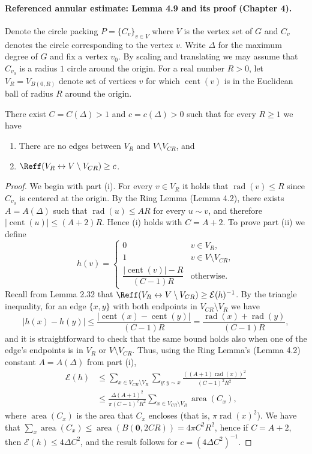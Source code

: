 \paragraph{Referenced annular estimate: Lemma 4.9 and its proof (Chapter 4).}
Denote the circle packing $P=\{C_v\}_{v\in V}$ where $V$ is the vertex set of $G$ and $C_v$ denotes the circle corresponding to the vertex $v$. Write $\Delta$ for the maximum degree of $G$ and fix a vertex $v_0$. By scaling and translating we may assume that $C_{v_0}$ is a radius $1$ circle around the origin. For a real number $R>0$, let $V_R=V_{B(0,R)}$ denote set of vertices $v$ for which $\operatorname{cent}(v)$ is in the Euclidean ball of radius $R$ around the origin.
\begin{lemma}[4.9]
There exist $C=C(\Delta)>1$ and $c=c(\Delta)>0$ such that for every $R\ge1$ we have
\begin{enumerate}[label=(\roman*)]
\item There are no edges between $V_R$ and $V\setminus V_{CR}$, and
\item $\Reff(V_R\leftrightarrow V\setminus V_{CR})\ge c$.
\end{enumerate}
\end{lemma}
\begin{proof}
We begin with part (i). For every $v\in V_R$ it holds that $\operatorname{rad}(v)\le R$ since $C_{v_0}$ is centered at the origin. By the Ring Lemma (Lemma 4.2), there exists $A=A(\Delta)$ such that $\operatorname{rad}(u)\le AR$ for every $u\sim v$, and therefore $|\operatorname{cent}(u)|\le(A+2)R$. Hence (i) holds with $C=A+2$.
To prove part (ii) we define
\[
h(v)=\begin{cases}
0&v\in V_R,\\1&v\in V\setminus V_{CR},\\
\dfrac{|\operatorname{cent}(v)|-R}{(C-1)R}&\text{otherwise}.
\end{cases}
\]
Recall from Lemma 2.32 that $\Reff(V_R\leftrightarrow V\setminus V_{CR})\ge\mathcal E(h)^{-1}$. By the triangle inequality, for an edge $\{x,y\}$ with both endpoints in $V_{CR}\setminus V_R$ we have
\[
|h(x)-h(y)|\le\frac{|\operatorname{cent}(x)-\operatorname{cent}(y)|}{(C-1)R}
=\frac{\operatorname{rad}(x)+\operatorname{rad}(y)}{(C-1)R},
\]
and it is straightforward to check that the same bound holds also when one of the edge's endpoints is in $V_R$ or $V\setminus V_{CR}$. Thus, using the Ring Lemma's (Lemma 4.2) constant $A=A(\Delta)$ from part (i),
\begin{align*}
\mathcal E(h)
&\le\sum_{x\in V_{CR}\setminus V_R}\sum_{y:y\sim x}
\frac{((A+1)\operatorname{rad}(x))^2}{(C-1)^2R^2}\\
&\le\frac{\Delta(A+1)^2}{\pi(C-1)^2R^2}\sum_{x\in V_{CR}\setminus V_R}\operatorname{area}(C_x),
\end{align*}
where $\operatorname{area}(C_x)$ is the area that $C_x$ encloses (that is, $\pi\operatorname{rad}(x)^2$). We have that $\sum_x\operatorname{area}(C_x)\le\operatorname{area}(B(\mathbf0,2CR))=4\pi C^2R^2$, hence if $C=A+2$, then $\mathcal E(h)\le4\Delta C^2$, and the result follows for $c=(4\Delta C^2)^{-1}$.
\end{proof}
